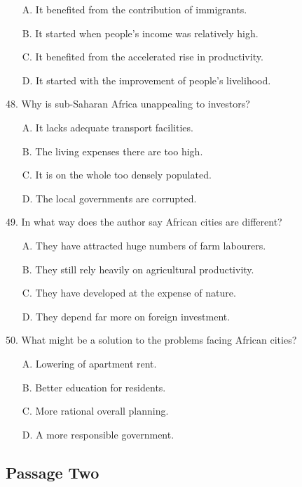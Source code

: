 \documentclass[UTF8,11pt]{ctexart}
\begin{document}
\begin{itemize}[leftmargin=2em,itemsep=.2em,topsep=.4em]\item[A.] It benefited from the contribution of immigrants.
\item[B.] It started when people’s income was relatively high.
\item[C.] It benefited from the accelerated rise in productivity.
\item[D.] It started with the improvement of people’s livelihood.
\end{itemize}

48. Why is sub-Saharan Africa unappealing to investors?


\begin{itemize}[leftmargin=2em,itemsep=.2em,topsep=.4em]\item[A.] It lacks adequate transport facilities.
\item[B.] The living expenses there are too high.
\item[C.] It is on the whole too densely populated.
\item[D.] The local governments are corrupted.
\end{itemize}

49. In what way does the author say African cities are different?


\begin{itemize}[leftmargin=2em,itemsep=.2em,topsep=.4em]\item[A.] They have attracted huge numbers of farm labourers.
\item[B.] They still rely heavily on agricultural productivity.
\item[C.] They have developed at the expense of nature.
\item[D.] They depend far more on foreign investment.
\end{itemize}

50. What might be a solution to the problems facing African cities?


\begin{itemize}[leftmargin=2em,itemsep=.2em,topsep=.4em]\item[A.] Lowering of apartment rent.
\item[B.] Better education for residents.
\item[C.] More rational overall planning.
\item[D.] A more responsible government.
\end{itemize}

\subsection*{\textbf{Passage Two}}
\end{document}
